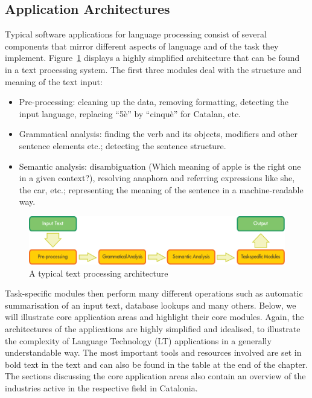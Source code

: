 \begin{multicols}{2}

\subsection{Application Architectures}

Typical software applications for language processing consist of several components that mirror different aspects of language and of the task they implement. Figure~\ref{fig:textprocessingarch_en} displays a highly simplified architecture that can be found in a text processing system. The first three modules deal with the structure and meaning of the text input:
\begin{itemize}
\item Pre-processing: cleaning up the data, removing formatting, detecting the input language, replacing “5è” by “cinquè” for Catalan, etc.
\item Grammatical analysis: finding the verb and its objects, modifiers and other sentence elements etc.; detecting the sentence structure.
\item Semantic analysis: disambiguation (Which meaning of apple is the right one in a given context?), resolving anaphora and referring expressions like she, the car, etc.; representing the meaning of the sentence in a machine-readable way.
\end{itemize}

\begin{figure}[b]
  \center
  \includegraphics[width=\textwidth]{../_media/english/text_processing_app_architecture}
  \caption{A typical text processing architecture}
  \label{fig:textprocessingarch_en}
\end{figure}

Task-specific modules then perform many different operations such as automatic summarisation of an input text, database lookups and many others. Below, we will illustrate core application areas and highlight their core modules. Again, the architectures of the applications are highly simplified and idealised, to illustrate the complexity of Language Technology (LT) applications in a generally understandable way. The most important tools and resources involved are set in bold text in the text and can also be found in the table at the end of the chapter.  The sections discussing the core application areas also contain an overview of the industries active in the respective field in Catalonia. 


\end{multicols}
